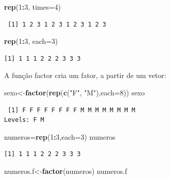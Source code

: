\documentclass[12pt,portuguese,oneside]{book}
\newenvironment{Shaded}{\begin{snugshade}}{\end{snugshade}}
\newcommand{\KeywordTok}[1]{\textcolor[rgb]{0.13,0.29,0.53}{\textbf{#1}}}
\newcommand{\DataTypeTok}[1]{\textcolor[rgb]{0.13,0.29,0.53}{#1}}
\newcommand{\DecValTok}[1]{\textcolor[rgb]{0.00,0.00,0.81}{#1}}
\newcommand{\StringTok}[1]{\textcolor[rgb]{0.31,0.60,0.02}{#1}}
\newcommand{\OperatorTok}[1]{\textcolor[rgb]{0.81,0.36,0.00}{\textbf{#1}}}
\newcommand{\NormalTok}[1]{#1}
\begin{document}
\begin{Shaded}
\begin{Highlighting}[]
\KeywordTok{rep}\NormalTok{(}\DecValTok{1}\OperatorTok{:}\DecValTok{3}\NormalTok{, }\DataTypeTok{times=}\DecValTok{4}\NormalTok{)}
\end{Highlighting}
\end{Shaded}

\begin{verbatim}
 [1] 1 2 3 1 2 3 1 2 3 1 2 3
\end{verbatim}

\begin{Shaded}
\begin{Highlighting}[]
\KeywordTok{rep}\NormalTok{(}\DecValTok{1}\OperatorTok{:}\DecValTok{3}\NormalTok{, }\DataTypeTok{each=}\DecValTok{3}\NormalTok{)}
\end{Highlighting}
\end{Shaded}

\begin{verbatim}
[1] 1 1 1 2 2 2 3 3 3
\end{verbatim}

A função factor cria um fator, a partir de um vetor:

\begin{Shaded}
\begin{Highlighting}[]
\NormalTok{sexo<-}\KeywordTok{factor}\NormalTok{(}\KeywordTok{rep}\NormalTok{(}\KeywordTok{c}\NormalTok{(}\StringTok{"F"}\NormalTok{, }\StringTok{"M"}\NormalTok{),}\DataTypeTok{each=}\DecValTok{8}\NormalTok{))}
\NormalTok{sexo}
\end{Highlighting}
\end{Shaded}

\begin{verbatim}
 [1] F F F F F F F F M M M M M M M M
Levels: F M
\end{verbatim}

\begin{Shaded}
\begin{Highlighting}[]
\NormalTok{numeros=}\KeywordTok{rep}\NormalTok{(}\DecValTok{1}\OperatorTok{:}\DecValTok{3}\NormalTok{,}\DataTypeTok{each=}\DecValTok{3}\NormalTok{)}
\NormalTok{numeros}
\end{Highlighting}
\end{Shaded}

\begin{verbatim}
[1] 1 1 1 2 2 2 3 3 3
\end{verbatim}

\begin{Shaded}
\begin{Highlighting}[]
\NormalTok{numeros.f<-}\KeywordTok{factor}\NormalTok{(numeros)}
\NormalTok{numeros.f}
\end{Highlighting}
\end{Shaded}
\end{document}

